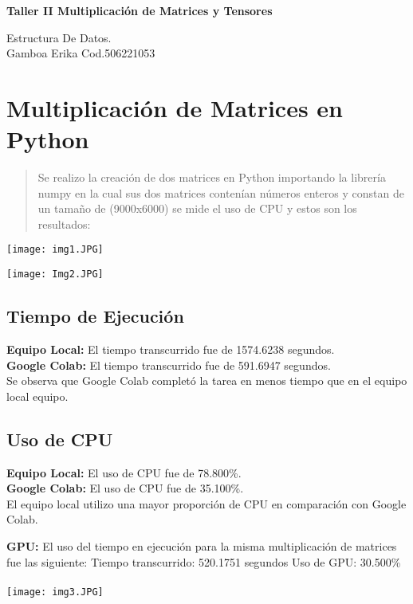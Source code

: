 \documentclass{article}
\author{Gamboa Macias Erika  Cod.506221053}
\date{}
\begin{document}
\begin{titlepage}
\centering
\vspace*{\fill}
{\Huge\textbf{Taller II Multiplicación de Matrices y Tensores}}
\vspace{2em}

{\large Estructura De Datos.}\\
{\large Gamboa Erika  Cod.506221053}
\vspace*{\fill}
\end{titlepage}


\section{Multiplicación de Matrices en Python}
\begin{quote}
Se realizo la creación de dos matrices en Python importando la librería numpy en la cual sus dos matrices 
contenían números enteros  y constan de un tamaño de (9000x6000) se mide el uso de CPU y estos son los resultados:
\end{quote}
\begin{minipage}{1\textwidth}
  \centering
  \texttt{[image: img1.JPG]}
\end{minipage}
\hfill
\begin{minipage}{1\textwidth}
\texttt{[image: Img2.JPG]}
\end{minipage}

\subsection{Tiempo de Ejecución}

\textbf{Equipo Local:} El tiempo transcurrido fue de 1574.6238 segundos. \\
\textbf{Google Colab:} El tiempo transcurrido fue de 591.6947 segundos. \\
Se observa que Google Colab completó la tarea en menos tiempo que en el equipo local equipo.

\subsection{Uso de CPU}
\textbf{Equipo Local:} El uso de CPU fue de 78.800\%. \\
\textbf{Google Colab:} El uso de CPU fue de 35.100\%. \\
El equipo local utilizo una mayor proporción de CPU en comparación con Google Colab.

\newpage
\textbf{GPU:} El uso del tiempo en ejecución para la misma multiplicación de matrices fue las siguiente: Tiempo transcurrido: 520.1751 segundos
Uso de GPU: 30.500\% \\\\
\texttt{[image: img3.JPG]}
\end{document}
